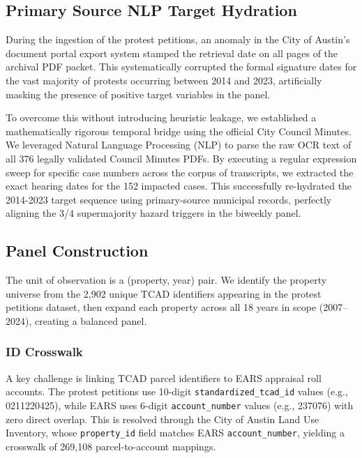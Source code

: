 \subsection{Primary Source NLP Target Hydration}

During the ingestion of the protest petitions, an anomaly in the City of Austin's document portal export system stamped the retrieval date on all pages of the archival PDF packet. This systematically corrupted the formal signature dates for the vast majority of protests occurring between 2014 and 2023, artificially masking the presence of positive target variables in the panel. 

To overcome this without introducing heuristic leakage, we established a mathematically rigorous temporal bridge using the official City Council Minutes. We leveraged Natural Language Processing (NLP) to parse the raw OCR text of all 376 legally validated Council Minutes PDFs. By executing a regular expression sweep for specific case numbers across the corpus of transcripts, we extracted the exact hearing dates for the 152 impacted cases. This successfully re-hydrated the 2014-2023 target sequence using primary-source municipal records, perfectly aligning the 3/4 supermajority hazard triggers in the biweekly panel.

\subsection{Panel Construction}

The unit of observation is a (property, year) pair.
We identify the property universe from the 2,902 unique TCAD identifiers appearing in the
protest petitions dataset, then expand each property across all 18 years in scope
(2007--2024), creating a balanced panel.

\subsubsection{ID Crosswalk}
\label{sec:crosswalk}

A key challenge is linking TCAD parcel identifiers to EARS appraisal roll accounts.
The protest petitions use 10-digit \texttt{standardized\_tcad\_id} values
(e.g., 0211220425), while EARS uses 6-digit \texttt{account\_number} values
(e.g., 237076) with zero direct overlap. This is resolved through the
City of Austin Land Use Inventory, whose \texttt{property\_id} field matches
EARS \texttt{account\_number}, yielding a crosswalk of 269,108 parcel-to-account mappings.

